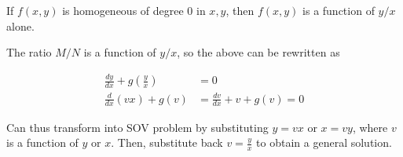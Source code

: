 \begin{corollary}
    If $f(x,y)$ is homogeneous of degree 0 in $x,y$, then $f(x,y)$ is a function of $y/x$ alone.
\end{corollary}

The ratio $M/N$ is a function of $y/x$, so the above can be rewritten as

\begin{align}
    \frac{dy}{dx}+g(\frac{y}{x})&=0\\
    \frac{d}{dx}(vx)+g(v)&=\frac{dv}{dx}+v+g(v)=0
\end{align}
    
Can thus transform into SOV problem by substituting $y=vx$ or $x=vy$, where $v$ is a function of $y$ or $x$.
Then, substitute back $v=\frac{y}{x}$ to obtain a general solution.